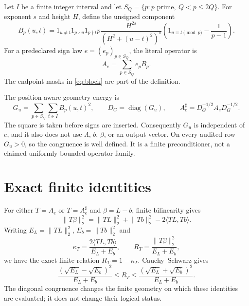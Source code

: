 \documentclass[10pt]{article}
\newcommand{\norm}[1]{\lVert #1\rVert_2}
\begin{document}
Let $I$ be a finite integer interval and let
$S_Q=\{p: p\text{ prime},\ Q<p\leq 2Q\}$.  For exponent $s$ and height $H$,
define the unsigned component
\begin{equation}
 B_p(u,t)=1_{u\ne t}1_{p\nmid u}1_{p\nmid t}
 p\frac{H^{2s}}{(H^2+(u-t)^2)^s}
 \left(1_{u\equiv t\pmod p}-\frac1{p-1}\right).
 \label{eq:block}
\end{equation}
For a predeclared sign law $e=(e_p)_{p\in S_Q}$, the literal operator is
\begin{equation}
 A_e=\sum_{p\in S_Q}e_pB_p.
 \label{eq:operator}
\end{equation}
The endpoint masks in \eqref{eq:block} are part of the definition.

The position-aware geometry energy is
\begin{equation}
 G_u=\sum_{p\in S_Q}\sum_{t\in I}B_p(u,t)^2,
 \qquad D_G=\operatorname{diag}(G_u),
 \qquad A_e^\sharp=D_G^{-1/2}A_eD_G^{-1/2}.
 \label{eq:normalization}
\end{equation}
The square is taken before signs are inserted.  Consequently $G_u$ is
independent of $e$, and it also does not use $\Lambda$, $b$, $\beta$, or an
output vector.  On every audited row $G_u>0$, so the congruence is well
defined.  It is a finite preconditioner, not a claimed uniformly bounded
operator family.

\section{Exact finite identities}

For either $T=A_e$ or $T=A_e^\sharp$ and $\beta=L-b$, finite bilinearity gives
\begin{equation}
 \norm{T\beta}^2=\norm{TL}^2+\norm{Tb}^2-2\langle TL,Tb\rangle.
 \label{eq:polar}
\end{equation}
Writing $E_L=\norm{TL}^2$, $E_b=\norm{Tb}^2$ and
\begin{equation}
 \kappa_T=\frac{2\langle TL,Tb\rangle}{E_L+E_b},
 \qquad R_T=\frac{\norm{T\beta}^2}{E_L+E_b},
 \label{eq:kappa}
\end{equation}
we have the exact finite relation $R_T=1-\kappa_T$.  Cauchy--Schwarz gives
\begin{equation}
 \frac{(\sqrt{E_L}-\sqrt{E_b})^2}{E_L+E_b}
 \leq R_T\leq
 \frac{(\sqrt{E_L}+\sqrt{E_b})^2}{E_L+E_b}.
 \label{eq:cauchy}
\end{equation}
The diagonal congruence changes the finite geometry on which these identities
are evaluated; it does not change their logical status.
\end{document}
